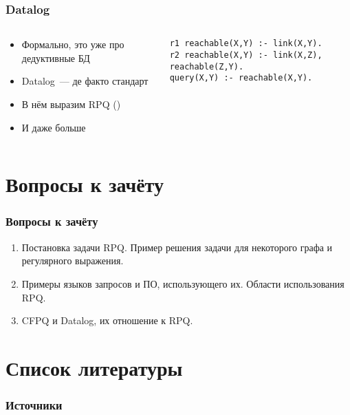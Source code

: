 \documentclass[
    aspectratio=169,
]{beamer}
\begin{document}
\begin{frame}[fragile]
    \frametitle{Datalog}

    \begin{columns}
        \begin{column}{0.5\textwidth}
            \begin{itemize}
                \item Формально, это уже про дедуктивные БД
                \item Datalog~--- де факто стандарт
                \item В нём выразим RPQ (\cite{green_datalog_2013})
                \item И даже больше
            \end{itemize}
        \end{column}
        \begin{column}{0.5\textwidth}
            \begin{verbatim}
r1 reachable(X,Y) :- link(X,Y).
r2 reachable(X,Y) :- link(X,Z), reachable(Z,Y).
query(X,Y) :- reachable(X,Y).
            \end{verbatim}
        \end{column}
    \end{columns}
\end{frame}

\section{Вопросы к зачёту}
\begin{frame}
    \frametitle{Вопросы к зачёту}

    \begin{enumerate}
        \item Постановка задачи RPQ.
              Пример решения задачи для некоторого графа и регулярного выражения.
        \item Примеры языков запросов и ПО, использующего их.
              Области использования RPQ.
        \item CFPQ и Datalog, их отношение к RPQ.
    \end{enumerate}

\end{frame}

\appendix
\section{Список литературы}
\begin{frame}
    \frametitle{Источники}
    \printbibliography[heading=none]
\end{frame}
\end{document}
